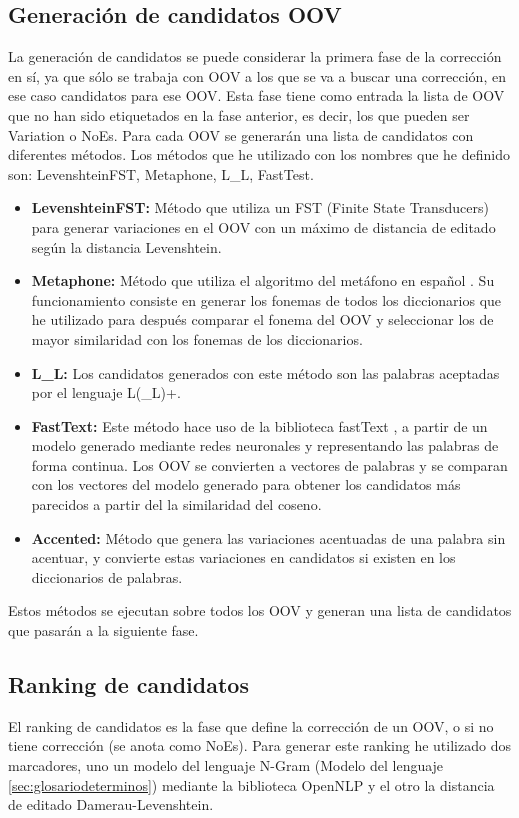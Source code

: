\documentclass[spanish,12pt, a4paper,twoside]{paper}
\begin{document}
\subsection{Generación de candidatos OOV}\label{sec:generaciondecandidatosoov}
La generación de candidatos se puede considerar la primera fase de la corrección en sí, ya que sólo se trabaja con OOV a los que se va a buscar una corrección, en ese caso candidatos para ese OOV.
Esta fase tiene como entrada la lista de OOV que no han sido etiquetados en la fase anterior, es decir, los que pueden ser Variation o NoEs. Para cada OOV se generarán una lista de candidatos con diferentes métodos. Los métodos que he utilizado con los nombres que he definido son: LevenshteinFST, Metaphone, L\_L, FastTest.

\begin{itemize}
	\item \textbf{LevenshteinFST:} Método que utiliza un FST (Finite State Transducers) para generar variaciones en el OOV con un máximo de distancia de editado según la distancia Levenshtein.
	\item \textbf{Metaphone:} Método que utiliza el algoritmo del metáfono en español \cite{mosquera:2011}. Su funcionamiento consiste en generar los fonemas de todos los diccionarios que he utilizado para después comparar el fonema del OOV y seleccionar los de mayor similaridad con los fonemas de los diccionarios.
	\item \textbf{L\_L:} Los candidatos generados con este método son las palabras aceptadas por el lenguaje L(\_L)+.
	\item \textbf{FastText:} Este método hace uso de la biblioteca fastText \cite{facebook:fasttext}, a partir de un modelo generado mediante redes neuronales y representando las palabras de forma continua. Los OOV se convierten a vectores de palabras y se comparan con los vectores del modelo generado para obtener los candidatos más parecidos a partir del la similaridad del coseno.
	\item \textbf{Accented:} Método que genera las variaciones acentuadas de una palabra sin acentuar, y convierte estas variaciones en candidatos si existen en los diccionarios de palabras.
\end{itemize}

Estos métodos se ejecutan sobre todos los OOV y generan una lista de candidatos que pasarán a la siguiente fase.

\subsection{Ranking de candidatos}\label{sec:rankingdecandidatos}
El ranking de candidatos es la fase que define la corrección de un OOV, o si no tiene corrección (se anota como NoEs). Para generar este ranking he utilizado dos marcadores, uno un modelo del lenguaje N-Gram (Modelo del lenguaje \ref{sec:glosariodeterminos}) mediante la biblioteca OpenNLP \cite{opennlp} y el otro la distancia de editado Damerau-Levenshtein.\\
\end{document}
